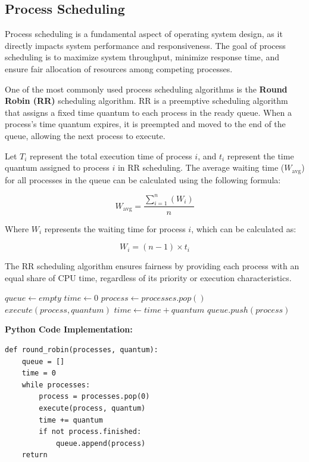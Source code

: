 \documentclass[12pt]{book} %
\begin{document}
\subsection{Process Scheduling}
Process scheduling is a fundamental aspect of operating system design, as it directly impacts system performance and responsiveness. The goal of process scheduling is to maximize system throughput, minimize response time, and ensure fair allocation of resources among competing processes.

One of the most commonly used process scheduling algorithms is the \textbf{Round Robin (RR)} scheduling algorithm. RR is a preemptive scheduling algorithm that assigns a fixed time quantum to each process in the ready queue. When a process's time quantum expires, it is preempted and moved to the end of the queue, allowing the next process to execute.

Let $T_i$ represent the total execution time of process $i$, and $t_i$ represent the time quantum assigned to process $i$ in RR scheduling. The average waiting time ($W_{\text{avg}}$) for all processes in the queue can be calculated using the following formula:

\[
W_{\text{avg}} = \frac{\sum_{i=1}^{n} (W_i)}{n}
\]

Where $W_i$ represents the waiting time for process $i$, which can be calculated as:

\[
W_i = (n - 1) \times t_i
\]

The RR scheduling algorithm ensures fairness by providing each process with an equal share of CPU time, regardless of its priority or execution characteristics.
\FloatBarrier
\begin{algorithm}
\caption{Round Robin (RR) Scheduling Algorithm}\label{rr}
\begin{algorithmic}[1]
\State $queue \gets empty$
\State $time \gets 0$
\State $process \gets processes.pop()$
\State $execute(process, quantum)$
\State $time \gets time + quantum$
\State $queue.push(process)$
\EndIf
\EndWhile
\EndProcedure
\end{algorithmic}
\end{algorithm}
\FloatBarrier
\textbf{Python Code Implementation:}
\FloatBarrier
\begin{lstlisting}
def round_robin(processes, quantum):
    queue = []
    time = 0
    while processes:
        process = processes.pop(0)
        execute(process, quantum)
        time += quantum
        if not process.finished:
            queue.append(process)
    return
\end{lstlisting}
\FloatBarrier
\end{document}
